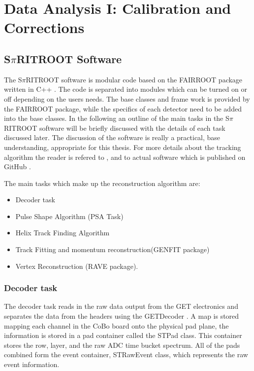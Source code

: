 \chapter{Data Analysis I: Calibration and Corrections}

\section{S$\pi$RITROOT Software}
\label{sec:software}

The S$\pi$RITROOT software is modular code based on the FAIRROOT package written in C++ \cite{fairroot}. The code is separated into modules which can be turned on or off depending on the users needs. The base classes and frame work is provided by the FAIRROOT package, while the specifics of each detector need to be added into the base classes. In the following an outline of the main tasks in the S$\pi$RITROOT software will be briefly discussed with the details of each task discussed later. The discussion of the software is really a practical, base understanding, appropriate for this thesis. For more details about the tracking algorithm the reader is refered to \cite{spiritroot_paper}, and to actual software which is published on GitHub \cite{spiritroot_git}. 

The main tasks which make up the reconstruction algorithm are:

\begin{itemize}
  \item Decoder task
  \item Pulse Shape Algorithm (PSA Task)
  \item Helix Track Finding Algorithm
  \item Track Fitting and momentum reconstruction(GENFIT package)
  \item Vertex Reconstruction (RAVE package).
\end{itemize}


\subsection{Decoder task}
The decoder task reads in the raw data output from the GET electronics and separates the data from the headers using the GETDecoder \cite{getdecoder}. A map is stored mapping each channel in the CoBo board onto the physical pad plane, the information is stored in a pad container called the STPad class. This container stores the row, layer, and the raw ADC time bucket spectrum. All of the pads combined form the event container, STRawEvent class, which represents the raw event information. 

